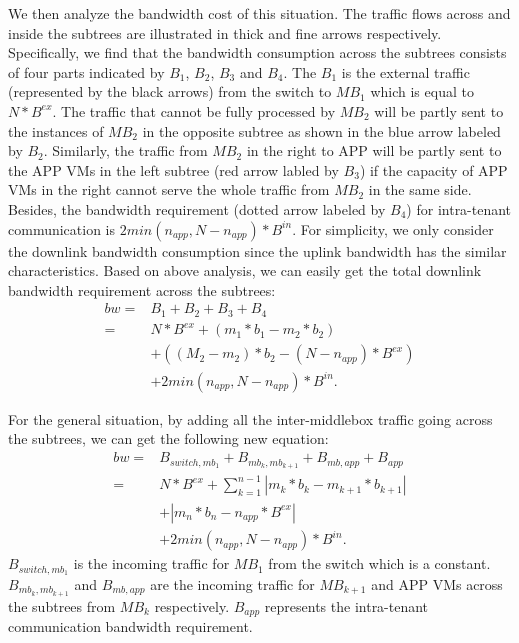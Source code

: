 \documentclass[review]{elsarticle}
\begin{document}
We then analyze the bandwidth cost of this situation. The traffic flows across and inside the subtrees are illustrated in thick and fine arrows respectively. Specifically, we find that the bandwidth consumption across the subtrees consists of four parts indicated by $B_1$, $B_2$, $B_3$ and $B_4$. The $B_1$ is the external traffic (represented by the black arrows) from the switch to $MB_1$ which is equal to $N*B^{ex}$. The traffic that cannot be fully processed by $MB_2$ will be partly sent to the instances of $MB_2$ in the opposite subtree as shown in the blue arrow labeled by $B_2$. Similarly, the traffic from $MB_2$ in the right to APP will be partly sent to the APP VMs in the left subtree (red arrow labled by $B_3$) if the capacity of APP VMs in the right cannot serve the whole traffic from $MB_2$ in the same side. Besides, the bandwidth requirement (dotted arrow labeled by $B_4$) for intra-tenant communication is $2min⁡(n_{app}  ,N-n_{app})*B^{in}$. For simplicity, we only consider the downlink bandwidth consumption since the uplink bandwidth has the similar characteristics. Based on above analysis, we can easily get the total downlink bandwidth requirement across the subtrees:
\begin{equation}
\begin{aligned}
bw = &B_1+B_2+B_3+B_4 \\
=&N*B^{ex}+(m_1*b_1-m_2*b_2)\\
&+((M_2-m_2)*b_2-(N-n_{app})*B^{ex})\\
&+2min(n_{app}, N-n_{app})*B^{in}.
\end{aligned}
\end{equation}

For the general situation, by adding all the inter-middlebox traffic going across the subtrees, we can get the following new equation:
\begin{equation}
\begin{aligned}
bw= &B_{switch,mb_{1}}+B_{mb_k,mb_{k+1}}+B_{mb,app}+B_{app}\\
 =&N*B^{ex}+\sum\limits_{k=1}^{n-1}|m_k*b_k-m_{k+1}*b_{k+1}|\\
&+|m_n*b_n-n_{app}*B^{ex}|
\\&+2min(n_{app}, N-n_{app})*B^{in}.
\end{aligned}
\label{equ:bw_equation}
\end{equation}
%
$B_{switch,mb_1}$ is the incoming traffic for $MB_1$ from the switch which is a constant. $B_{mb_k,mb_{k+1}}$ and $B_{mb,app}$ are the incoming traffic for $MB_{k+1}$ and APP VMs across the subtrees from $MB_k$ respectively. $B_{app}$ represents the intra-tenant communication bandwidth requirement.
\end{document}
